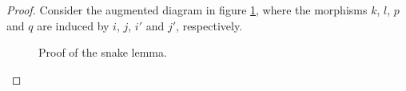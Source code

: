 \begin{proof}
	Consider the augmented diagram in figure \ref{fig:snake_lemma}, where the morphisms $k$, $l$, $p$ and $q$ are induced by $i$, $j$, $i'$ and $j'$, respectively.
	\begin{figure}[h!tb]
		\centering
		\caption{Proof of the snake lemma.}
		\label{fig:snake_lemma}
	\end{figure}


\end{proof}
